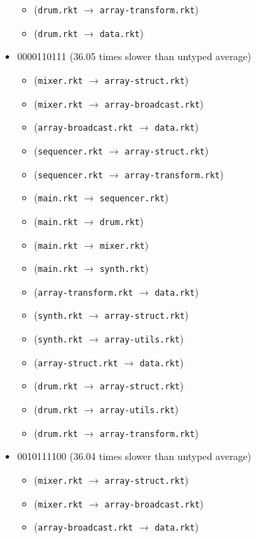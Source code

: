 \documentclass{article}
\newcommand{\mono}[1]{\texttt{#1}}
\begin{document}
\begin{itemize}
\begin{itemize}
  \item (\mono{drum.rkt} $\rightarrow$ \mono{array-transform.rkt})
  \item (\mono{drum.rkt} $\rightarrow$ \mono{data.rkt})
  \end{itemize}
\item 0000110111 (36.05 times slower than untyped average)
  \begin{itemize}
  \item (\mono{mixer.rkt} $\rightarrow$ \mono{array-struct.rkt})
  \item (\mono{mixer.rkt} $\rightarrow$ \mono{array-broadcast.rkt})
  \item (\mono{array-broadcast.rkt} $\rightarrow$ \mono{data.rkt})
  \item (\mono{sequencer.rkt} $\rightarrow$ \mono{array-struct.rkt})
  \item (\mono{sequencer.rkt} $\rightarrow$ \mono{array-transform.rkt})
  \item (\mono{main.rkt} $\rightarrow$ \mono{sequencer.rkt})
  \item (\mono{main.rkt} $\rightarrow$ \mono{drum.rkt})
  \item (\mono{main.rkt} $\rightarrow$ \mono{mixer.rkt})
  \item (\mono{main.rkt} $\rightarrow$ \mono{synth.rkt})
  \item (\mono{array-transform.rkt} $\rightarrow$ \mono{data.rkt})
  \item (\mono{synth.rkt} $\rightarrow$ \mono{array-struct.rkt})
  \item (\mono{synth.rkt} $\rightarrow$ \mono{array-utils.rkt})
  \item (\mono{array-struct.rkt} $\rightarrow$ \mono{data.rkt})
  \item (\mono{drum.rkt} $\rightarrow$ \mono{array-struct.rkt})
  \item (\mono{drum.rkt} $\rightarrow$ \mono{array-utils.rkt})
  \item (\mono{drum.rkt} $\rightarrow$ \mono{array-transform.rkt})
  \end{itemize}
\item 0010111100 (36.04 times slower than untyped average)
  \begin{itemize}
  \item (\mono{mixer.rkt} $\rightarrow$ \mono{array-struct.rkt})
  \item (\mono{mixer.rkt} $\rightarrow$ \mono{array-broadcast.rkt})
  \item (\mono{array-broadcast.rkt} $\rightarrow$ \mono{data.rkt})

\end{itemize}
\end{itemize}
\end{document}
